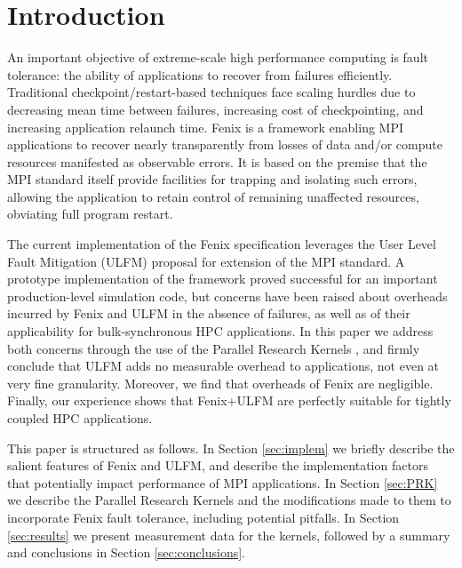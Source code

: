 \section{Introduction}
An important objective of extreme-scale high performance computing is fault tolerance:
the ability of applications to recover from failures efficiently.
Traditional checkpoint/restart-based techniques face scaling hurdles due to decreasing
mean time between failures, increasing cost of checkpointing, and 
increasing application relaunch time.
Fenix is a framework enabling MPI applications to recover nearly transparently from 
losses of data and/or compute resources manifested as observable errors.
It is based on the premise that the MPI standard itself provide facilities for trapping
and isolating such errors, allowing the application to retain control of remaining unaffected
resources, obviating full program restart.

The current implementation of the Fenix specification \cite{fenixspec} leverages
the  User Level Fault Mitigation (ULFM) \cite{bland2013post} proposal for extension
of the MPI standard.
A prototype implementation of the framework \cite{Gamell:2014} proved successful for
an important production-level simulation code, but concerns have been raised about
overheads incurred by Fenix and ULFM in the absence of failures, as well as of their
applicability for bulk-synchronous HPC applications.
In this paper we address both concerns through the use of the Parallel Research Kernels
\cite{van2016comparing}, and firmly conclude that ULFM adds no measurable
overhead to applications, not even at very fine granularity.
Moreover, we find that overheads of Fenix are negligible.
Finally, our experience shows that Fenix+ULFM are perfectly suitable for tightly coupled
HPC applications.

This paper is structured as follows.
In Section \ref{sec:implem} we briefly describe the salient features of Fenix and ULFM,
and describe the implementation factors that potentially impact performance of MPI applications.
In Section \ref{sec:PRK} we describe the Parallel Research Kernels and the modifications
made to them to incorporate Fenix fault tolerance, including potential pitfalls.
In Section \ref{sec:results} we present measurement data for the kernels,
followed by a summary and conclusions in Section \ref{sec:conclusions}.
